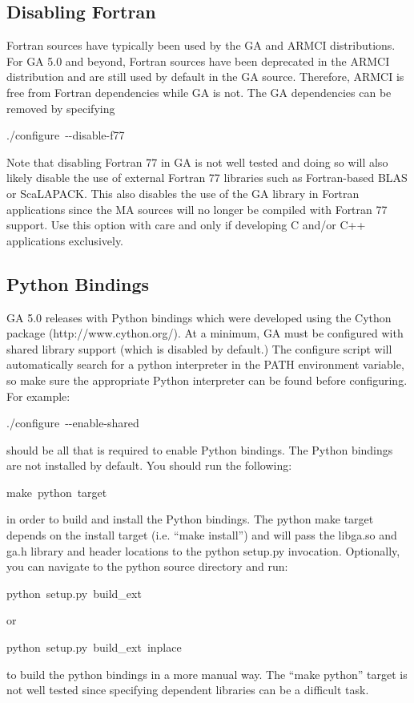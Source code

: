 \subsection{Disabling Fortran }

Fortran sources have typically been used by the GA and ARMCI distributions.
For GA 5.0 and beyond, Fortran sources have been deprecated in the
ARMCI distribution and are still used by default in the GA source.
Therefore, ARMCI is free from Fortran dependencies while GA is not.
The GA dependencies can be removed by specifying 
\begin{lyxcode}
./configure~-{}-disable-f77~
\end{lyxcode}
Note that disabling Fortran 77 in GA is not well tested and doing
so will also likely disable the use of external Fortran 77 libraries
such as Fortran-based BLAS or ScaLAPACK. This also disables the use
of the GA library in Fortran applications since the MA sources will
no longer be compiled with Fortran 77 support. Use this option with
care and only if developing C and/or C++ applications exclusively. 


\subsection{Python Bindings }

GA 5.0 releases with Python bindings which were developed using the
Cython package (http://www.cython.org/). At a minimum, GA must be
configured with shared library support (which is disabled by default.)
The configure script will automatically search for a python interpreter
in the PATH environment variable, so make sure the appropriate Python
interpreter can be found before configuring. For example: 
\begin{lyxcode}
./configure~-{}-enable-shared~
\end{lyxcode}
should be all that is required to enable Python bindings. The Python
bindings are not installed by default. You should run the following: 
\begin{lyxcode}
make~python~target~
\end{lyxcode}
in order to build and install the Python bindings. The python make
target depends on the install target (i.e. \textquotedblleft{}make
install\textquotedblright{}) and will pass the libga.so and ga.h library
and header locations to the python setup.py invocation. Optionally,
you can navigate to the python source directory and run: 
\begin{lyxcode}
python~setup.py~build\_ext~
\end{lyxcode}
or 
\begin{lyxcode}
python~setup.py~build\_ext~\textendash{}inplace~
\end{lyxcode}
to build the python bindings in a more manual way. The \textquotedblleft{}make
python\textquotedblright{} target is not well tested since specifying
dependent libraries can be a difficult task. 

